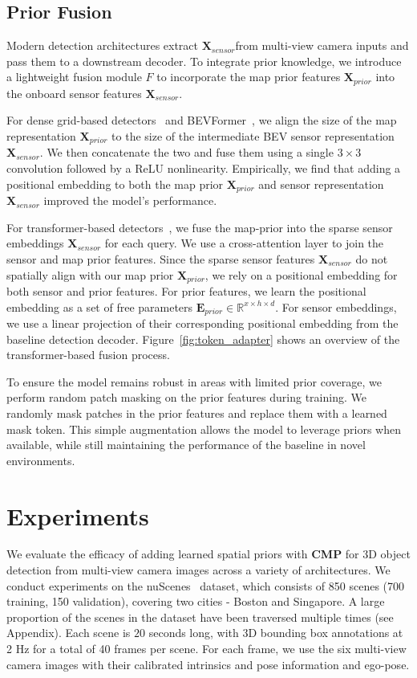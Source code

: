 \documentclass{article} %
\newcommand{\xfeat}{\ensuremath{\mathbf{X}_{sensor}}}
\newcommand{\xprior}{\ensuremath{\mathbf{X}_{prior}}}
\newcommand{\posprior}{\ensuremath{\mathbf{E}_{prior}}}
\newcommand{\ours}{CMP\xspace}
\newcommand{\oursbold}{\textbf{\ours}\xspace}
\begin{document}
\subsection{Prior Fusion}
\label{subsection:fusion}
Modern detection architectures extract \xfeat from multi-view camera inputs and pass them to a downstream decoder.
To integrate prior knowledge, we introduce a lightweight fusion module $F$ to incorporate the map prior features $\xprior$ into the onboard sensor features $\xfeat$.

For dense grid-based detectors~\cite{huang2021bevdet} and BEVFormer~\cite{li2022bevformer}, we align the size of the map representation $\xprior$ to the size of the intermediate BEV sensor representation $\xfeat$.
We then concatenate the two and fuse them using a single $3 \times 3$ convolution followed by a ReLU nonlinearity.
Empirically, we find that adding a positional embedding to both the map prior $\xprior$ and sensor representation $\xfeat$ improved the model's performance.

For transformer-based detectors~\cite{wang2022detr3d,liu2022petr,liu2022petrv2}, we fuse the map-prior into the sparse sensor embeddings $\xfeat$ for each query.
We use a cross-attention layer to join the sensor and map prior features.
Since the sparse sensor features $\xfeat$ do not spatially align with our map prior $\xprior$, we rely on a positional embedding for both sensor and prior features.
For prior features, we learn the positional embedding as a set of free parameters $\posprior \in \mathbb{R}^{x \times h \times d}$.
For sensor embeddings, we use a linear projection of their corresponding positional embedding from the baseline detection decoder.
Figure~\ref{fig:token_adapter} shows an overview of the transformer-based fusion process.

To ensure the model remains robust in areas with limited prior coverage, we perform random patch masking on the prior features during training.
We randomly mask patches in the prior features and replace them with a learned mask token.
This simple augmentation allows the model to leverage priors when available, while still maintaining the performance of the baseline in novel environments.

\section{Experiments}
\label{sec:results}

We evaluate the efficacy of adding learned spatial priors with \oursbold for 3D object detection from multi-view camera images across a variety of architectures.
We conduct experiments on the nuScenes~\cite{caesar2020nuscenes} dataset, which consists of 850 scenes (700 training, 150 validation), covering two cities - Boston and Singapore.
A large proportion of the scenes in the dataset have been traversed multiple times (see Appendix).
Each scene is $20$ seconds long, with 3D bounding box annotations at 2 Hz for a total of 40 frames per scene.
For each frame, we use the six multi-view camera images with their calibrated intrinsics and pose information and ego-pose.
\end{document}
